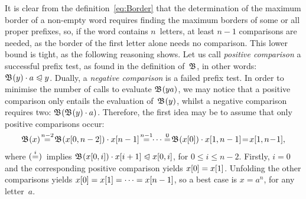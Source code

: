 It is clear from the definition~\eqref{eq:Border} 
that the determination of the maximum border of a non\hyp{}empty word
requires finding the maximum borders of some or all proper prefixes,
so, if the word contains \(n\)~letters, at least \(n-1\) comparisons
are needed, as the border of the first letter alone needs no
comparison. This lower bound is tight, as the following reasoning
shows. Let us call \emph{positive comparison} a successful prefix test, as
found in the definition of~\(\mathfrak{B}\), in other words:
\(\mathfrak{B}^{}(y) \cdot a \mathrel{\trianglelefteqslant} y\). Dually, a \emph{negative
comparison} is a
failed prefix test. In order to minimise the number of calls to
evaluate \(\mathfrak{B}^{}(ya)\), we may notice that a positive comparison
only entails the evaluation of~\(\mathfrak{B}^{}(y)\), whilst a negative
comparison requires two: \(\mathfrak{B}^{}(\mathfrak{B}^{}(y) \cdot
  a)\). Therefore, the first idea may be to assume that only positive
comparisons occur:
\begin{equation*}
\Border{}{x} \!\eqn{n-2}\!
\Border{}{\ind{x}{0,n-2}} \cdot \ind{x}{n-1}
\!\eqn{n-1}\!\! \dots
\eqn{0}\! \Border{}{\ind{x}{0}} \cdot \ind{x}{1,n-1}
\!=\! \ind{x}{1,n\!-\!1},
\end{equation*}
where \((\smash{\mathrel{\stackrel{\smash{i}}{=}}})\)~implies \(\mathfrak{B}^{}({x}[{0,i}]) \cdot
{x}[{i+1}] \mathrel{\trianglelefteqslant} {x}[{0,i}]\), for \(0 \leqslant i \leqslant
n-2\). Firstly, \(i=0\) and the corresponding positive comparison
yields \({x}[{0}] = {x}[{1}]\). Unfolding the other comparisons
yields \({x}[{0}] = {x}[{1}] = \dots = {x}[{n-1}]\), so a best
case is \(x=a^n\), for any letter~\(a\).

